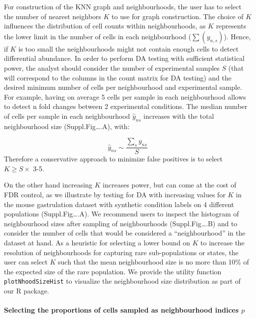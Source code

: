 \documentclass[
]{article}
\begin{document}
For construction of the KNN graph and neighbourhoods, the user has to select the number of nearest neighbors \(K\) to use for graph construction.
The choice of \(K\) influences the distribution of cell counts within neighbourhoods, as \(K\) represents the lower limit in the number of cells in each neighbourhood (\(\sum(y_{n,s})\)). Hence, if \(K\) is too small the neighbourhoods might not contain enough cells to detect differential abundance. In order to perform DA testing with sufficient statistical power, the analyst should consider the number of experimental samples \(S\) (that will correspond to the columns in the count matrix for DA testing) and the desired minimum number of cells per neighbourhood and experimental sample. For example, having on average 5 cells per sample in each neighbourhood allows to detect n fold changes between 2 experimental conditions.
The median number of cells per sample in each neighbourhood \(\hat{y}_{ns}\) increases with the total neighbourhood size (Suppl.Fig\ldots.A), with:

\[
\hat{y}_{ns} \sim \frac{\sum_s y_{ns}}{S}
\]
Therefore a conservative approach to minimize false positives is to select \(K \geq S \times\) 3-5.

On the other hand increasing \(K\) increases power, but can come at the cost of FDR control, as we illustrate by testing for DA with increasing values for \(K\) in
the mouse gastrulation dataset with synthetic condition labels on 4 different populations (Suppl.Fig\ldots.A). We recommend users to inspect the histogram of
neighbourhood sizes after sampling of neighbourhoods (Suppl.Fig\ldots.B) and to consider the number of cells that would be considered a ``neighbourhood'' in the
dataset at hand. As a heuristic for selecting a lower bound on \(K\) to increase the resolution of neighbourhoods for capturing rare sub-populations or states,
the user can select \(K\) such that the mean neighbourhood size is no more than 10\% of the expected size of the rare population. We provide the utility function
\texttt{plotNhoodSizeHist} to visualize the neighbourhood size distribution as part of our R package.

\hypertarget{selecting-the-proportions-of-cells-sampled-as-neighbourhood-indices-p}{%
\paragraph*{\texorpdfstring{Selecting the proportions of cells sampled as neighbourhood indices \(p\)}{Selecting the proportions of cells sampled as neighbourhood indices p}}\label{selecting-the-proportions-of-cells-sampled-as-neighbourhood-indices-p}}
\end{document}
